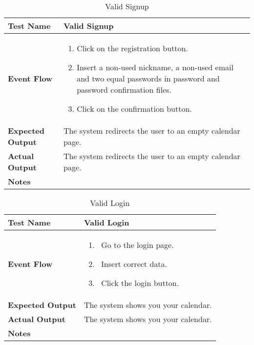 \begin{table}[h]	
	\centering
	\def\arraystretch{1.5}
	\begin{tabular}{|m{7cm}|m{7cm}|}
		\hline
		\textbf{Test Name}            &  Valid Signup  \\ \hline
		\textbf{Event Flow}             &  
		\begin{enumerate}
			\item Click on the registration button.
			\item Insert a non-used nickname, a non-used email and two equal passwords in password and password confirmation files.
			\item Click on the confirmation button.
		\end{enumerate} \\ \hline
		\textbf{Expected Output}  &  The system redirects the user to an empty calendar page.   \\ \hline
		\textbf{Actual Output}       & The system redirects the user to an empty calendar page.    \\ \hline
		\textbf{Notes} & \\ \hline
	\end{tabular}
	\caption{Valid Signup}
\end{table}


\begin{table}[h]	
	\centering
	\def\arraystretch{1.5}
	\begin{tabular}{|m{7cm}|m{7cm}|}
		\hline
		\textbf{Test Name}            &  Valid Login  \\ \hline
		\textbf{Event Flow}             &  
		\begin{enumerate}
			\item~Go to the login page.
			\item~Insert correct data.
			\item~Click the login button.
		\end{enumerate}
		\\ \hline
		\textbf{Expected Output}  &  The system shows you your calendar.   \\ \hline
		\textbf{Actual Output}       &  The system shows you your calendar.   \\ \hline
		\textbf{Notes} & \\ \hline
	\end{tabular}
	\caption{Valid Login}
\end{table}


